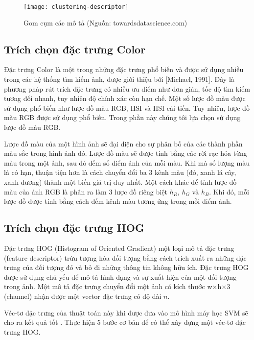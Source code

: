 \begin{figure}[h]
	\centering
	\texttt{[image: clustering-descriptor]}
	\caption[Gom cụm các mô tả]{Gom cụm các mô tả (Nguồn: towardsdatascience.com)}
	\label{fig:clustering-descriptor}
\end{figure}	


\subsection{Trích chọn đặc trưng Color}
Đặc trưng Color là một trong những đặc trưng phổ biến và được sử dụng nhiều trong các hệ thống tìm kiếm ảnh, được giới thiệu bởi [Michael, 1991]. Đây là phương pháp rút trích đặc trưng có nhiều ưu điểm như đơn giản, tốc độ tìm kiếm tương đối nhanh, tuy nhiên độ chính xác còn hạn chế. Một số lược đồ màu được sử dụng phổ biến như lược đồ màu RGB, HSI và HSI cải tiến. Tuy nhiên, lược đồ màu RGB được sử dụng phổ biến.  Trong phần này chúng tôi lựa chọn sử dụng lược đồ màu RGB.\par

Lược đồ màu của một hình ảnh sẽ đại diện cho sự phân bố của các thành phần màu sắc trong hình ảnh đó. Lược đồ màu sẽ được tính bằng các rời rạc hóa từng màu trong một ảnh, sau đó đếm số điểm ảnh của mỗi màu. Khi mà số lượng màu là có hạn, thuận tiện hơn là cách chuyển đổi ba 3 kênh màu (đỏ, xanh lá cây, xanh dương) thành một biến giá trị duy nhất. Một cách khác để tính lược đồ màu của ảnh RGB là phân ra làm 3 lược đồ riêng biệt $h_R$, $h_G$ và $h_B$. Khi đó, mỗi lược đồ được tính bằng cách đếm kênh màu tương ứng trong mỗi điểm ảnh.

\subsection{Trích chọn đặc trưng HOG}
Đặc trưng HOG (Histogram of Oriented Gradient) \cite{dalal2005histograms} một loại mô tả đặc trưng (feature descriptor) trừu tượng hóa đối tượng bằng cách trích xuất ra những đặc trưng của đối tượng đó và bỏ đi những thông tin không hữu ích. Đặc trưng HOG được sử dụng chủ yếu để mô tả hình dạng và sự xuất hiện của một đối tượng trong ảnh. Một mô tả đặc trưng chuyển đổi một ảnh có kích thước w$\times$h$\times$3 (channel) nhận được một vector đặc trưng có độ dài $n$.\par

Véc-tơ đặc trưng của thuật toán này khi được đưa vào mô hình máy học SVM sẽ cho ra kết quả tốt \cite{learnopencv}. Thực hiện 5 bước cơ bản để có thể xây dựng một véc-tơ đặc trưng HOG. \par

